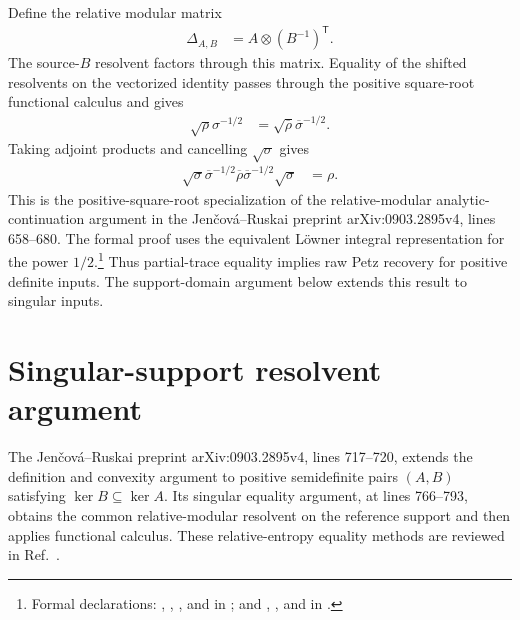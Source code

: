 \documentclass[11pt]{article}
\begin{document}
Define the relative modular matrix
\begin{align}
    \Delta_{A,B}
        &=A\otimes(B^{-1})^{\mathsf T}.
    \label{eq:cpsv16_ssa_equality_hayashi_markov_relative_modular_matrix}
\end{align}
The source-$B$ resolvent factors through this matrix. Equality of the shifted
resolvents on the vectorized identity passes through the positive square-root
functional calculus and gives
\begin{align}
    \sqrt{\rho} \sigma^{-1/2}
        &=\sqrt{\overline\rho} \overline\sigma^{-1/2}.
    \label{eq:cpsv16_ssa_equality_hayashi_markov_positive_sqrt_ratio}
\end{align}
Taking adjoint products and cancelling $\sqrt{\sigma}$ gives
\begin{align}
    \sqrt{\sigma}
    \overline\sigma^{-1/2}
    \overline\rho
    \overline\sigma^{-1/2}
    \sqrt{\sigma}
        &=\rho.
    \label{eq:cpsv16_ssa_equality_hayashi_markov_positive_petz_sandwich}
\end{align}
This is the positive-square-root specialization of the relative-modular
analytic-continuation argument in the Jen\v{c}ov\'a--Ruskai preprint
arXiv:0903.2895v4, lines 658--680. The formal proof uses the equivalent
L\"owner integral representation for the power $1/2$.\footnote{Formal
declarations:
,
,
, and
 in
; and
,
, and
 in
.}
Thus partial-trace equality implies raw Petz recovery for positive definite
inputs. The support-domain argument below extends this result to singular
inputs.

\section{Singular-support resolvent argument}

The Jen\v{c}ov\'a--Ruskai preprint arXiv:0903.2895v4, lines 717--720, extends
the definition and convexity argument to positive semidefinite pairs $(A,B)$
satisfying $\ker B\subseteq\ker A$. Its singular equality argument, at
lines 766--793, obtains the common relative-modular resolvent on the reference
support and then applies functional calculus. These relative-entropy equality
methods are reviewed in Ref.~\cite{Cirac2021Matrix}.
\end{document}
